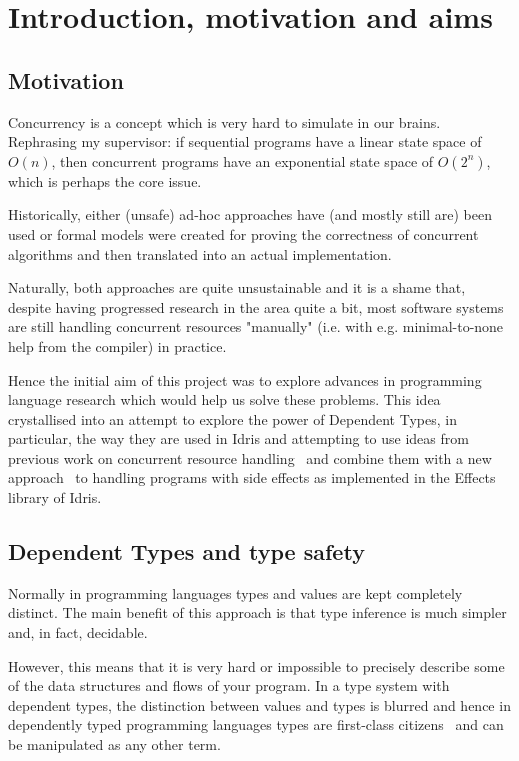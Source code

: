 \section{Introduction, motivation and aims}

\subsection{Motivation}

Concurrency is a concept which is very hard to simulate in our brains.
Rephrasing my supervisor: if sequential programs have a linear state space of
$O(n)$, then concurrent programs have an exponential state space of $O(2^n)$,
which is perhaps the core issue.

Historically, either (unsafe) ad-hoc approaches have (and mostly still are)
been used or formal models were created for proving the correctness of
concurrent algorithms and then translated into an actual implementation.

Naturally, both approaches are quite unsustainable and it is a shame that,
despite having progressed research in the area quite a bit, most software
systems are still handling concurrent resources "manually" (i.e. with e.g.
minimal-to-none help from the compiler) in practice.

Hence the initial aim of this project was to explore advances in programming
language research which would help us solve these problems. This idea
crystallised into an attempt to explore the power of Dependent Types, in
particular, the way they are used in Idris and attempting to use ideas from
previous work on concurrent resource handling~\cite{cbconc-fi} and combine them
with a new approach~\cite{eff} to handling programs with side effects as
implemented in the Effects~\cite{effects-idr} library of Idris.

\subsection{Dependent Types and type safety}

Normally in programming languages types and values are kept completely
distinct. The main benefit of this approach is that type inference is much
simpler and, in fact, decidable.

However, this means that it is very hard or impossible to precisely
describe some of the data structures and flows of your program. In a type
system with dependent types, the distinction between values and types is
blurred and hence in dependently typed programming languages types are
first-class citizens~\cite[p.~3]{idris-tutorial} and can be manipulated as any
other term.

